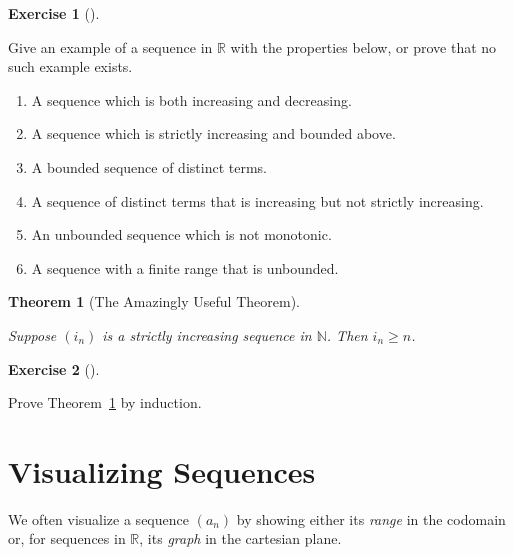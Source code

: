 \documentclass[
  letterpaper,
  DIV=11,
  numbers=noendperiod]{scrreprt}
\providecommand{\tightlist}{%
  \setlength{\itemsep}{0pt}\setlength{\parskip}{0pt}}
\def\R{\mathbb R}
\def\N{\mathbb N}
\theoremstyle{plain}
\newtheorem{theorem}{Theorem}[chapter]
\theoremstyle{definition}
\newtheorem{exercise}{Exercise}[chapter]
\theoremstyle{plain}
\theoremstyle{plain}
\theoremstyle{definition}
\theoremstyle{definition}
\theoremstyle{remark}
\begin{document}
\begin{exercise}[]\protect\hypertarget{exr-sequence-prop-example-generation}{}\label{exr-sequence-prop-example-generation}

Give an example of a sequence in \(\R\) with the properties below, or
prove that no such example exists.

\begin{enumerate}
\def\labelenumi{\arabic{enumi}.}
\tightlist
\item
  A sequence which is both increasing and decreasing.
\item
  A sequence which is strictly increasing and bounded above.
\item
  A bounded sequence of distinct terms.
\item
  A sequence of distinct terms that is increasing but not strictly
  increasing.
\item
  An unbounded sequence which is not monotonic.
\item
  A sequence with a finite range that is unbounded.
\end{enumerate}

\end{exercise}

\begin{theorem}[The Amazingly Useful
Theorem]\protect\hypertarget{thm-amazingly-useful}{}\label{thm-amazingly-useful}

Suppose \((i_n)\) is a strictly increasing sequence in \(\N\). Then
\(i_n\geq n\).

\end{theorem}

\begin{exercise}[]\protect\hypertarget{exr-amazingly-useful-proof}{}\label{exr-amazingly-useful-proof}

Prove Theorem~\ref{thm-amazingly-useful} by induction.

\end{exercise}

\section{Visualizing Sequences}\label{visualizing-sequences}

We often visualize a sequence \((a_n)\) by showing either its
\emph{range} in the codomain or, for sequences in \(\R\), its
\emph{graph} in the cartesian plane.
\end{document}
